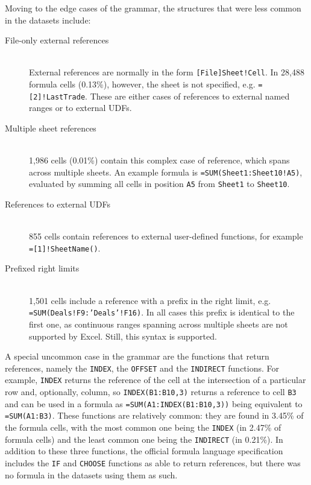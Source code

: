 \documentclass[conference]{IEEEtran}
\begin{document}
Moving to the edge cases of the grammar, the structures that were less common in the datasets include:

\begin{description}
	\item[File-only external references] \hfill \\
	External references are normally in the form \texttt{[File]Sheet!Cell}. In 28,488 formula cells (0.13\%), however, the sheet is not specified, e.g. \texttt{=[2]!LastTrade}. These are either cases of references to external named ranges or to external UDFs.
	\item[Multiple sheet references] \hfill \\
	1,986 cells (0.01\%) contain this complex case of reference, which spans across multiple sheets. An example formula is \texttt{=SUM(Sheet1:Sheet10!A5)}, evaluated by summing all cells in position \texttt{A5} from \texttt{Sheet1} to \texttt{Sheet10}.
	\item[References to external UDFs] \hfill \\
	855 cells contain references to external user-defined functions, for example \texttt{=[1]!SheetName()}.
	\item[Prefixed right limits] \hfill \\
	1,501 cells include a reference with a prefix in the right limit, e.g. \texttt{=SUM(Deals!F9:'Deals'!F16)}. In all cases this prefix is identical to the first one, as continuous ranges spanning across multiple sheets are not supported by Excel. Still, this syntax is supported.
\end{description}

A special uncommon case in the grammar are the functions that return references, namely the \texttt{INDEX}, the \texttt{OFFSET} and the \texttt{INDIRECT} functions. For example, \texttt{INDEX} returns the reference of the cell at the intersection of a particular row and, optionally, column, so \texttt{INDEX(B1:B10,3)} returns a reference to cell \texttt{B3} and can be used in a formula as \texttt{=SUM(A1:INDEX(B1:B10,3))} being equivalent to \texttt{=SUM(A1:B3)}. These functions are relatively common: they are found in 3.45\% of the formula cells, with the most common one being the \texttt{INDEX} (in 2.47\% of formula cells) and the least common one being the \texttt{INDIRECT} (in 0.21\%). In addition to these three functions, the official formula language specification includes the \texttt{IF} and \texttt{CHOOSE} functions as able to return references, but there was no formula in the datasets using them as such.
\end{document}

